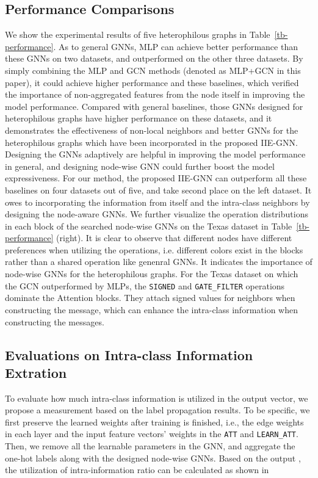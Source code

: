 \documentclass[sigconf]{acmart}
\begin{document}
\subsection{Performance Comparisons}
We show the experimental results of five heterophilous graphs in Table~\ref{tb-performance}. 
As to general GNNs, MLP can achieve better performance than these GNNs on two datasets, and outperformed on the other three datasets. By simply combining the MLP and GCN methods (denoted as MLP+GCN \cite{ma2021homophily} in this paper), it could achieve higher performance and these baselines, which verified the importance of non-aggregated features from the node itself in improving the model performance.
Compared with general baselines, those GNNs designed for heterophilous graphs have higher performance on these datasets, and it demonstrates the effectiveness of non-local neighbors and better GNNs for the heterophilous graphs which have been incorporated in the proposed IIE-GNN.
Designing the GNNs adaptively are helpful in improving the model performance in general, and designing node-wise GNN could further boost the model expressiveness.
For our method, the proposed IIE-GNN can outperform all these baselines on four datasets out of five, and take second place on the left dataset. It owes to incorporating the information from itself and the intra-class neighbors by designing the node-aware GNNs.
We further visualize the operation distributions in each block of the searched node-wise GNNs on the Texas dataset in Table~\ref{tb-performance} (right). It is clear to observe that different nodes have different preferences when utilizing the operations, i.e. different colors exist in the blocks rather than a shared operation like genenral GNNs. It indicates the importance of node-wise GNNs for the heterophilous graphs. 
For the Texas dataset on which the GCN outperformed by MLPs, the \texttt{SIGNED} and \texttt{GATE\_FILTER} operations dominate the Attention blocks. They attach signed values for neighbors when constructing the message, which can enhance the intra-class information when constructing the messages. 















\subsection{Evaluations on Intra-class Information Extration}
To evaluate how much intra-class information is utilized in the output vector, we propose a measurement based on the label propagation results.
To be specific, we first preserve the learned weights after training is finished, i.e., the edge weights  in each layer and the input feature vectors' weights in the \texttt{ATT} and \texttt{LEARN\_ATT}. Then, we remove all the learnable parameters in the GNN, and aggregate the one-hot labels  along with the designed node-wise GNNs.
Based on the output , the utilization of intra-information ratio can be calculated as shown in
\end{document}
